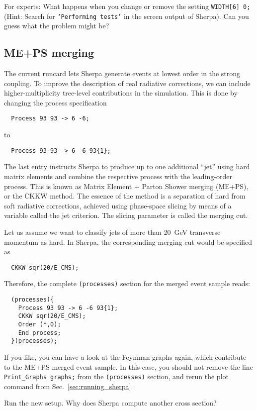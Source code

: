 \documentclass[10pt]{article}
\begin{document}
For experts: What happens when you change or remove the setting {\tt WIDTH[6] 0;}
(Hint: Search for {\tt `Performing tests'} in the screen output of Sherpa).
Can you guess what the problem might be?

\subsection{ME+PS merging}

The current runcard lets Sherpa generate events at lowest order in the strong coupling.
To improve the description of real radiative corrections, we can include higher-multiplicity
tree-level contributions in the simulation. This is done by changing the process specification

\begin{verbatim}
  Process 93 93 -> 6 -6;
\end{verbatim}
to
\begin{verbatim}
  Process 93 93 -> 6 -6 93{1};
\end{verbatim}
The last entry instructs Sherpa to produce up to one additional ``jet'' using
hard matrix elements and combine the respective process with the leading-order process.
This is known as Matrix Element + Parton Shower merging (ME+PS), or the CKKW method.
The essence of the method is a separation of hard from soft radiative corrections,
achieved using phase-space slicing by means of a variable called the jet criterion. The slicing parameter is called the merging cut.

Let us assume we want to classify jets of more than 20~GeV transverse momentum as hard.
In Sherpa, the corresponding merging cut would be specified as
\begin{verbatim}
  CKKW sqr(20/E_CMS);
\end{verbatim}
Therefore, the complete {\tt (processes)} section for the merged event sample reads:
\begin{verbatim}
  (processes){
    Process 93 93 -> 6 -6 93{1};
    CKKW sqr(20/E_CMS);
    Order (*,0);
    End process;
  }(processes);
\end{verbatim}
If you like, you can have a look at the Feynman graphs again, which contribute
to the ME+PS merged event sample. In this case, you should not remove the line
{\tt Print\_Graphs graphs;} from the {\tt (processes)} section, and rerun the 
plot command from Sec.~\ref{sec:running_sherpa}.

Run the new setup. Why does Sherpa compute another cross section?
\end{document}
